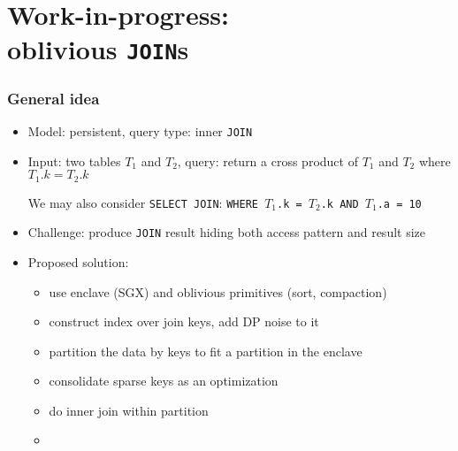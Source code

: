 \section{Work-in-progress: \\ oblivious \texttt{JOIN}s}

	\begin{frame}[label={frame:oblivious-joins}]

		\frametitle{General idea}

		\begin{itemize}
			\item<1->
				Model: \alert{persistent}, query type: \alert{inner \texttt{JOIN}}

			\item<2->
				Input: two tables $T_1$ and $T_2$, query: return a cross product of $T_1$ and $T_2$ where $T_1.k = T_2.k$ \\
				\begin{small}
					We may also consider \texttt{SELECT JOIN}: \texttt{WHERE $T_1$.k = $T_2$.k AND $T_1$.a = 10}
				\end{small}

			\item<3->
				\alert{Challenge}: produce \texttt{JOIN} result hiding both access pattern and result size

			\item<4->
				\alert{Proposed solution}:
				\begin{itemize}
					\item use enclave (SGX) and oblivious primitives (sort, compaction)
					\item construct index over join keys, add DP noise to it
					\item partition the data by keys to fit a partition in the enclave
					\item consolidate sparse keys as an optimization
					\item do inner join within partition
					\item[] \hyperlink{frame:appendix:joins-detailed}{}
				\end{itemize}

		\end{itemize}

	\end{frame}

